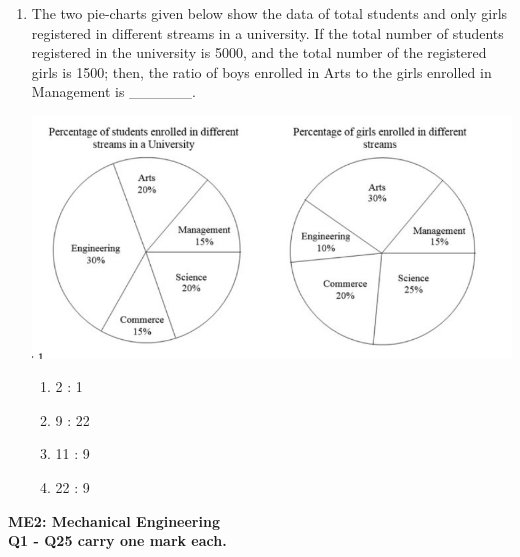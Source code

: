\documentclass[12pt,onecolumn]{article}
\begin{document}
\begin{enumerate}
    \item The two pie-charts given below show the data of total students and only girls registered in different streams in a university. If the total number of students registered in the university is 5000, and the total number of the registered girls is 1500; then, the ratio of boys enrolled in Arts to the girls enrolled in Management is \_\_\_\_\_\_.
          \begin{center}
              \includegraphics[scale=0.5]{q10s2}
          \end{center}
          \begin{enumerate}
              \item 2 : 1
              \item 9 : 22
              \item 11 : 9
              \item 22 : 9
          \end{enumerate}
\end{enumerate}
\noindent\large\textbf{ME2: Mechanical Engineering}\\
\normalsize\textbf{Q1 - Q25 carry one mark each.}
\end{document}
